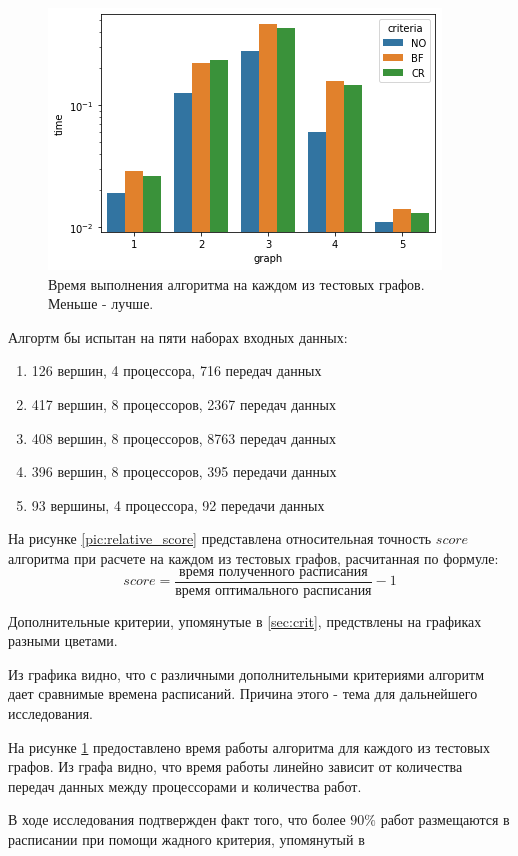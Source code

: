 \begin{figure}[H]
    \centering
    \includegraphics{imgs/times.png}
    \caption{Время выполнения алгоритма на каждом из тестовых графов. Меньше - лучше.}
    \label{pic:times}
\end{figure}

Алгортм бы испытан на пяти наборах входных данных:
\begin{enumerate}
    \item 126 вершин, 4 процессора, 716 передач данных
    \item 417 вершин, 8 процессоров, 2367 передач данных
    \item 408 вершин, 8 процессоров, 8763 передач данных
    \item 396 вершин, 8 процессоров, 395 передачи данных
    \item 93 вершины, 4 процессора, 92 передачи данных
\end{enumerate}

На рисунке \ref{pic:relative_score} представлена относительная точность $score$ алгоритма при расчете на каждом из тестовых графов, расчитанная по формуле:
\begin{equation*}
    score = \frac{\text{время полученного расписания}}{\text{время оптимального расписания}} - 1
\end{equation*}

Дополнительные критерии, упомянутые в \ref{sec:crit}, предствлены на графиках разными цветами.

Из графика видно, что с различными дополнительными критериями алгоритм дает сравнимые времена расписаний. Причина этого - тема для дальнейшего исследования.

На рисунке \ref{pic:times} предоставлено время работы алгоритма для каждого из тестовых графов. Из графа видно, что время работы линейно зависит от количества передач данных между процессорами и количества работ.

В ходе исследования подтвержден факт того, что более $90\%$ работ размещаются в расписании при помощи жадного критерия, упомянутый в \cite{Kostenko_2017}